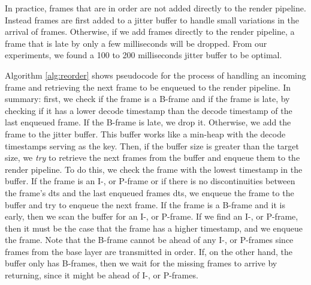 In practice, frames that are in order are not added directly to the render pipeline. Instead frames are first added to a jitter buffer to handle small variations in the arrival of frames. Otherwise, if we add frames directly to the render pipeline, a frame that is late by only a few milliseconds will be dropped. From our experiments, we found a 100 to 200 milliseconds jitter buffer to be optimal. %

Algorithm \ref{alg:reorder} shows pseudocode for the process of handling an incoming frame and retrieving the next frame to be enqueued to the render pipeline. In summary: first, we check if the frame is a B-frame and if the frame is late, by checking if it has a lower decode timestamp than the decode timestamp of the last enqueued frame. If the B-frame is late, we drop it. Otherwise, we add the frame to the jitter buffer. This buffer works like a min-heap with the decode timestamps serving as the key. Then, if the buffer size is greater than the target size, we \textit{try} to retrieve the next frames from the buffer and enqueue them to the render pipeline. To do this, we check the frame with the lowest timestamp in the buffer. If the frame is an I-, or P-frame or if there is no discontinuities between the frame's dts and the last enqueued frames dts, we enqueue the frame to the buffer and try to enqueue the next frame. If the frame is a B-frame and it is early, then we scan the buffer for an I-, or P-frame. If we find an I-, or P-frame, then it must be the case that the frame has a higher timestamp, and we enqueue the frame. Note that the B-frame cannot be ahead of any I-, or P-frames since frames from the base layer are transmitted in order. If, on the other hand, the buffer only has B-frames, then we wait for the missing frames to arrive by returning, since it might be ahead of I-, or P-frames.

